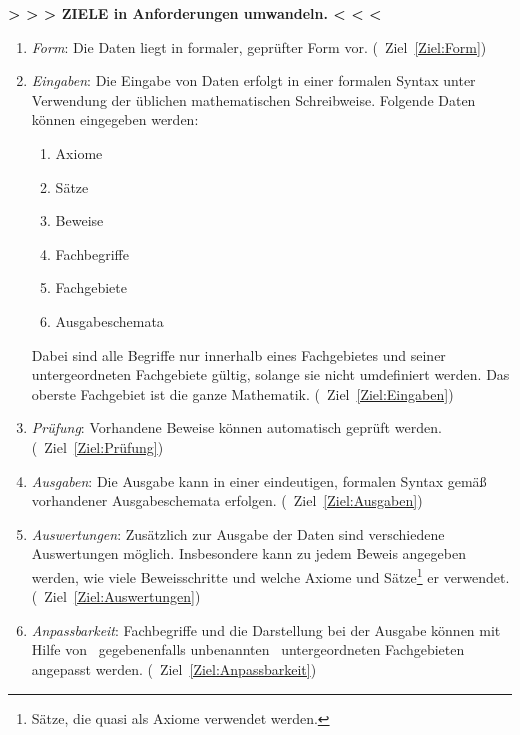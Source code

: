 \documentclass[english,ngerman,parskip=half,headsepline,footsepline]{scrreprt}
\begin{document}
	\textbf{> > > ZIELE in Anforderungen umwandeln. < < <} %
	\begin{enumerate}

		\item \label{Anforderung:Form} \emph{Form}: Die Daten liegt in formaler, geprüfter Form vor. (\seename\ Ziel~\vref{Ziel:Form})

		\item \label{Anforderung:Eingaben} \emph{Eingaben}: Die Eingabe von Daten erfolgt in einer formalen Syntax unter Verwendung der üblichen mathematischen Schreibweise. Folgende Daten können eingegeben werden:
		\begin{enumerate}
			\item Axiome
			\item Sätze
			\item Beweise
			\item Fachbegriffe
			\item Fachgebiete
			\item Ausgabeschemata
		\end{enumerate}
		Dabei sind alle Begriffe nur innerhalb eines Fachgebietes und seiner untergeordneten Fachgebiete gültig, solange sie nicht umdefiniert werden. Das oberste Fachgebiet ist die ganze Mathematik. (\seename\ Ziel~\vref{Ziel:Eingaben})

		\item \label{Anforderung:Prüfung} \emph{Prüfung}: Vorhandene Beweise können automatisch geprüft werden. (\seename\ Ziel~\vref{Ziel:Prüfung})

		\item \label{Anforderung:Ausgaben} \emph{Ausgaben}: Die Ausgabe kann in einer eindeutigen, formalen Syntax gemäß vorhandener Ausgabeschemata erfolgen. (\seename\ Ziel~\vref{Ziel:Ausgaben})

		\item \label{Anforderung:Auswertungen} \emph{Auswertungen}: Zusätzlich zur Ausgabe der Daten sind verschiedene Auswertungen möglich. Insbesondere kann zu jedem Beweis angegeben werden, wie viele Beweisschritte und welche Axiome und Sätze\footnote{Sätze, die quasi als Axiome verwendet werden.} er verwendet. (\seename\ Ziel~\vref{Ziel:Auswertungen})

		\item \label{Anforderung:Anpassbarkeit} \emph{Anpassbarkeit}: Fachbegriffe und die Darstellung bei der Ausgabe können mit Hilfe von \textendash\ gegebenenfalls unbenannten \textendash\ untergeordneten Fachgebieten angepasst werden. (\seename\ Ziel~\vref{Ziel:Anpassbarkeit})


\end{enumerate}
\end{document}
